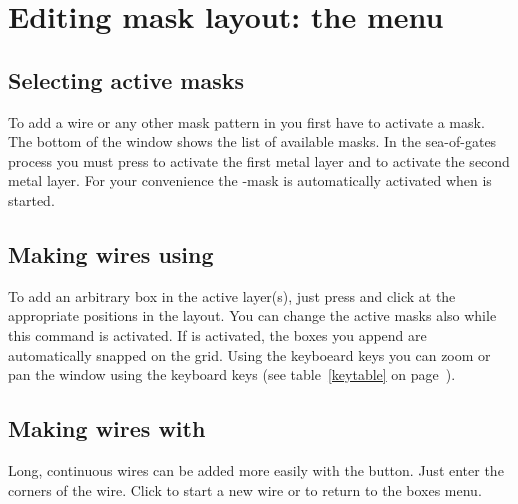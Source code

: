 \section{Editing mask layout: the \protect{} menu}
\subsection{Selecting active masks}
To add a wire or any other mask pattern in  you first
have to activate a mask.  
The bottom of the window shows the list of
available masks.  In the sea-of-gates process you must press
 to activate the first metal layer and 
to activate the second metal layer. For your convenience 
the -mask is automatically activated when 
 is started.
\subsection{Making wires using \protect{}}
To add an arbitrary box in the active layer(s), just press 
 and click at the appropriate positions in the 
layout. You can change the active masks also while this command is activated.
If  is activated,
 the boxes you
append are automatically snapped on the grid. Using the keyboeard keys you can
zoom or pan the window using the keyboard keys (see table~\ref{keytable} on
page~\pageref{keytable}).

\subsection{Making wires with \protect{}}
Long, continuous wires can be added more easily with the 
button.  Just enter the corners of the wire. Click  to
start a new wire or  to return to the boxes menu.


